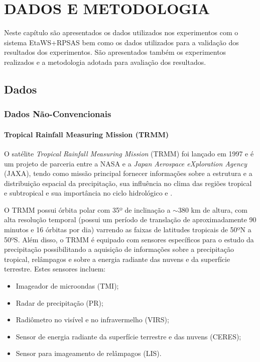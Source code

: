 \hypertarget{estilo:capitulo}{}
\chapter{DADOS E METODOLOGIA}

Neste capítulo são apresentados os dados utilizados nos experimentos com o sistema EtaWS+RPSAS bem como os dados utilizados para a validação dos resultados dos experimentos. São apresentados também os experimentos realizados e a metodologia adotada para avaliação dos resultados.

\section{Dados}
\label{ss:dados}

\subsection{Dados Não-Convencionais}

\subsubsection{Tropical Rainfall Measuring Mission (TRMM)}

O satélite \textit{Tropical Rainfall Measuring Mission} (TRMM) foi lançado em 1997 e é um projeto de parceria entre a NASA e a \textit{Japan Aerospace eXploration Agency} (JAXA), tendo como missão principal fornecer informações sobre a estrutura e a distribuição espacial da precipitação, sua influência no clima das regiões tropical e subtropical e sua importância no ciclo hidrológico \cite{simpsonetal88} e \cite{simpsonetal96}.

O TRMM possui órbita polar com 35º de inclinação a $\sim$380 km de altura, com alta resolução temporal (possui um período de translação de aproximadamente 90 minutos e 16 órbitas por dia) varrendo as faixas de latitudes tropicais de 50ºN a 50ºS. Além disso, o TRMM é equipado com sensores específicos para o estudo da precipitação possibilitando a aquisição de informações sobre a precipitação tropical, relâmpagos e sobre a energia radiante das nuvens e da superfície terrestre. Estes sensores incluem:

\begin{itemize}
\item Imageador de microondas (TMI);
\item Radar de precipitação (PR);
\item Radiômetro no visível e no infravermelho (VIRS);
\item Sensor de energia radiante da superfície terrestre e das nuvens (CERES);
\item Sensor para imageamento de relâmpagos (LIS).
\end{itemize}

